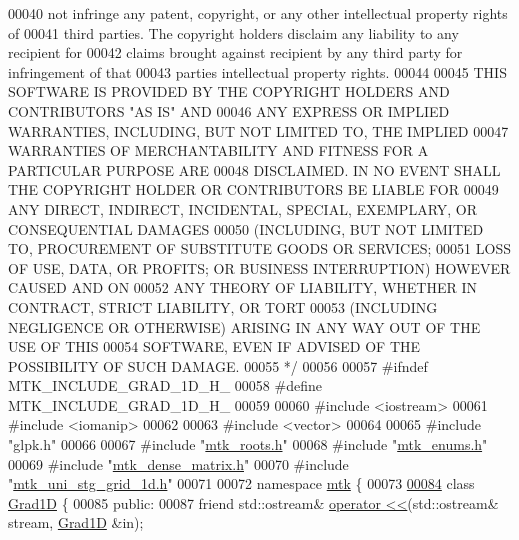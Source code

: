 \begin{DoxyCode}
00040 \textcolor{comment}{not infringe any patent, copyright, or any other intellectual property rights of}
00041 \textcolor{comment}{third parties. The copyright holders disclaim any liability to any recipient for}
00042 \textcolor{comment}{claims brought against recipient by any third party for infringement of that}
00043 \textcolor{comment}{parties intellectual property rights.}
00044 \textcolor{comment}{}
00045 \textcolor{comment}{THIS SOFTWARE IS PROVIDED BY THE COPYRIGHT HOLDERS AND CONTRIBUTORS "AS IS" AND}
00046 \textcolor{comment}{ANY EXPRESS OR IMPLIED WARRANTIES, INCLUDING, BUT NOT LIMITED TO, THE IMPLIED}
00047 \textcolor{comment}{WARRANTIES OF MERCHANTABILITY AND FITNESS FOR A PARTICULAR PURPOSE ARE}
00048 \textcolor{comment}{DISCLAIMED. IN NO EVENT SHALL THE COPYRIGHT HOLDER OR CONTRIBUTORS BE LIABLE FOR}
00049 \textcolor{comment}{ANY DIRECT, INDIRECT, INCIDENTAL, SPECIAL, EXEMPLARY, OR CONSEQUENTIAL DAMAGES}
00050 \textcolor{comment}{(INCLUDING, BUT NOT LIMITED TO, PROCUREMENT OF SUBSTITUTE GOODS OR SERVICES;}
00051 \textcolor{comment}{LOSS OF USE, DATA, OR PROFITS; OR BUSINESS INTERRUPTION) HOWEVER CAUSED AND ON}
00052 \textcolor{comment}{ANY THEORY OF LIABILITY, WHETHER IN CONTRACT, STRICT LIABILITY, OR TORT}
00053 \textcolor{comment}{(INCLUDING NEGLIGENCE OR OTHERWISE) ARISING IN ANY WAY OUT OF THE USE OF THIS}
00054 \textcolor{comment}{SOFTWARE, EVEN IF ADVISED OF THE POSSIBILITY OF SUCH DAMAGE.}
00055 \textcolor{comment}{*/}
00056 
00057 \textcolor{preprocessor}{#ifndef MTK\_INCLUDE\_GRAD\_1D\_H\_}
00058 \textcolor{preprocessor}{#define MTK\_INCLUDE\_GRAD\_1D\_H\_}
00059 
00060 \textcolor{preprocessor}{#include <iostream>}
00061 \textcolor{preprocessor}{#include <iomanip>}
00062 
00063 \textcolor{preprocessor}{#include <vector>}
00064 
00065 \textcolor{preprocessor}{#include "glpk.h"}
00066 
00067 \textcolor{preprocessor}{#include "\hyperlink{mtk__roots_8h}{mtk\_roots.h}"}
00068 \textcolor{preprocessor}{#include "\hyperlink{mtk__enums_8h}{mtk\_enums.h}"}
00069 \textcolor{preprocessor}{#include "\hyperlink{mtk__dense__matrix_8h}{mtk\_dense\_matrix.h}"}
00070 \textcolor{preprocessor}{#include "\hyperlink{mtk__uni__stg__grid__1d_8h}{mtk\_uni\_stg\_grid\_1d.h}"}
00071 
00072 \textcolor{keyword}{namespace }\hyperlink{namespacemtk}{mtk} \{
00073 
\hypertarget{mtk__grad__1d_8h_source_l00084}{}\hyperlink{classmtk_1_1Grad1D}{00084} \textcolor{keyword}{class }\hyperlink{classmtk_1_1Grad1D}{Grad1D} \{
00085  \textcolor{keyword}{public}:
00087   \textcolor{keyword}{friend} std::ostream& \hyperlink{classmtk_1_1Grad1D_aeba97883d95c0b4546a98bebe8ef3106}{operator <<}(std::ostream& stream, \hyperlink{classmtk_1_1Grad1D}{Grad1D} &in);

\end{DoxyCode}
